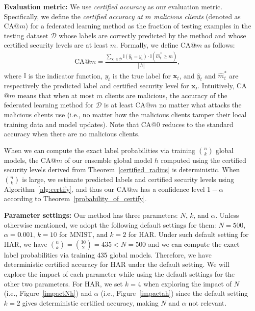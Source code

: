\documentclass[letterpaper]{article} %
\begin{document}
\noindent
{\bf Evaluation metric:} 
We use  \emph{certified accuracy} as our evaluation metric. 
Specifically, we define the \emph{certified accuracy at $m$ malicious clients} (denoted as CA$@m$) for a federated learning method as the fraction of testing examples in the testing dataset $\mathcal{D}$ whose labels are correctly predicted by the method and whose certified security levels are at least $m$. Formally, we define CA$@m$ as follows: 
\begin{align}
\text{CA}@m=\frac{\sum_{\mathbf{x}_t \in \mathcal{D}} \mathbb{I}(\hat{y}_t=y_t)\cdot \mathbb{I}(\hat{m}_{t}^{*}\geq m)}{|\mathcal{D}|},
\end{align}
where $\mathbb{I}$ is the indicator function, $y_t$ is the true label for $\mathbf{x}_t$, and $\hat{y}_t$ and $\hat{m}_{t}^{*}$ are respectively the predicted label and  certified security level for $\mathbf{x}_t$. Intuitively, CA$@m$ means that when at most $m$ clients are malicious, the accuracy of the federated learning method for $\mathcal{D}$ is at least CA$@m$ no matter what attacks the malicious clients use (i.e., no matter how the malicious clients tamper their local training data and model updates). Note that CA$@0$ reduces to the standard accuracy when there are no malicious clients. 

When we can compute the exact label probabilities via training ${n \choose k}$ global models, the CA$@m$ of our ensemble global model $h$ computed using the certified security levels derived from Theorem~\ref{certified_radius} is deterministic. When ${n \choose k}$ is large, we estimate predicted labels and certified security levels using Algorithm~\ref{alg:certify}, and thus our CA$@m$ has a confidence level $1-\alpha$ according to Theorem~\ref{probability_of_certify}. 

\noindent
{\bf Parameter settings:}  Our method has three parameters: $N$, $k$, and $\alpha$. Unless otherwise mentioned, we adopt the following default settings for them: $N=500$, $\alpha=0.001$,  $k=10$ for MNIST, and $k=2$ for HAR.  
Under such default setting for HAR, we have ${n \choose k}={30 \choose 2} = 435 < N=500$ and  we can compute the exact label probabilities via training 435 global models. Therefore, we have deterministic certified accuracy for HAR under the default setting. We will explore the impact of each parameter while using the default settings for the other two parameters. For HAR, we set $k=4$ when exploring the impact of $N$ (i.e., Figure~\ref{impactNh}) and $\alpha$ (i.e., Figure~\ref{impactah}) since the default setting $k=2$ gives deterministic certified accuracy, making $N$ and $\alpha$ not relevant. 
\end{document}
